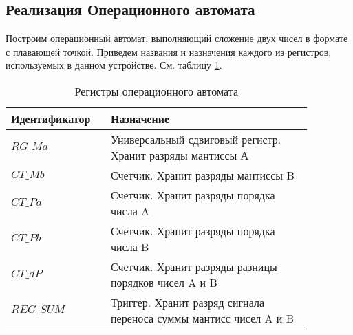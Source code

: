 \documentclass[a4paper,14pt]{extarticle}
\begin{document}
\subsection {Реализация Операционного автомата}
Построим операционный автомат, выполняющий сложение двух чисел в формате с плавающей точкой. Приведем названия и назначения каждого из регистров, используемых в данном устройстве. См. таблицу \ref{tab:regs5}.
\begin{table}[h!]
	\centering
	\small
		\begin{tabular}{|m{0.27\linewidth}|m{0.6\linewidth}|}
			\hline
			\textbf{Идентификатор} & \textbf{Назначение} \\ \hline
			$RG\_Ma$ & Универсальный сдвиговый регистр. Хранит разряды мантиссы А\\ \hline
			$CT\_Mb$ & Счетчик. Хранит разряды мантиссы B\\ \hline
			$CT\_Pa$ & Счетчик. Хранит разряды порядка числа A \\\hline
			$CT\_Pb$ & Счетчик. Хранит разряды порядка числа B \\ \hline
			$CT\_dP$ & Счетчик. Хранит разряды разницы порядков чисел A и B\\ \hline
			$REG\_SUM$& Триггер. Хранит разряд сигнала переноса суммы мантисс чисел A и B\\\hline
		\end{tabular}
		\caption{Регистры операционного автомата}
		\label{tab:regs5}
\end{table}
\end{document}
